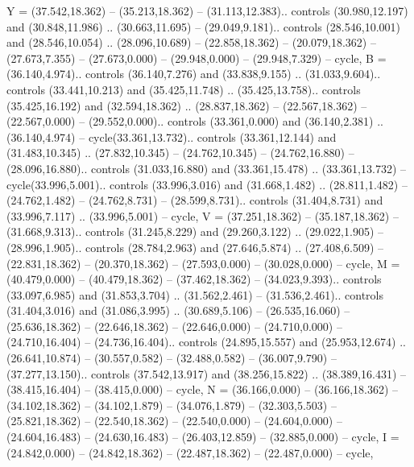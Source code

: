 {Y} = {(37.542,18.362) -- (35.213,18.362) -- (31.113,12.383).. controls (30.980,12.197) and (30.848,11.986) .. (30.663,11.695) -- (29.049,9.181).. controls (28.546,10.001) and (28.546,10.054) .. (28.096,10.689) -- (22.858,18.362) -- (20.079,18.362) -- (27.673,7.355) -- (27.673,0.000) -- (29.948,0.000) -- (29.948,7.329) -- cycle},
{B} = {(36.140,4.974).. controls (36.140,7.276) and (33.838,9.155) .. (31.033,9.604).. controls (33.441,10.213) and (35.425,11.748) .. (35.425,13.758).. controls (35.425,16.192) and (32.594,18.362) .. (28.837,18.362) -- (22.567,18.362) -- (22.567,0.000) -- (29.552,0.000).. controls (33.361,0.000) and (36.140,2.381) .. (36.140,4.974) -- cycle(33.361,13.732).. controls (33.361,12.144) and (31.483,10.345) .. (27.832,10.345) -- (24.762,10.345) -- (24.762,16.880) -- (28.096,16.880).. controls (31.033,16.880) and (33.361,15.478) .. (33.361,13.732) -- cycle(33.996,5.001).. controls (33.996,3.016) and (31.668,1.482) .. (28.811,1.482) -- (24.762,1.482) -- (24.762,8.731) -- (28.599,8.731).. controls (31.404,8.731) and (33.996,7.117) .. (33.996,5.001) -- cycle},
{V} = {(37.251,18.362) -- (35.187,18.362) -- (31.668,9.313).. controls (31.245,8.229) and (29.260,3.122) .. (29.022,1.905) -- (28.996,1.905).. controls (28.784,2.963) and (27.646,5.874) .. (27.408,6.509) -- (22.831,18.362) -- (20.370,18.362) -- (27.593,0.000) -- (30.028,0.000) -- cycle},
{M} = {(40.479,0.000) -- (40.479,18.362) -- (37.462,18.362) -- (34.023,9.393).. controls (33.097,6.985) and (31.853,3.704) .. (31.562,2.461) -- (31.536,2.461).. controls (31.404,3.016) and (31.086,3.995) .. (30.689,5.106) -- (26.535,16.060) -- (25.636,18.362) -- (22.646,18.362) -- (22.646,0.000) -- (24.710,0.000) -- (24.710,16.404) -- (24.736,16.404).. controls (24.895,15.557) and (25.953,12.674) .. (26.641,10.874) -- (30.557,0.582) -- (32.488,0.582) -- (36.007,9.790) -- (37.277,13.150).. controls (37.542,13.917) and (38.256,15.822) .. (38.389,16.431) -- (38.415,16.404) -- (38.415,0.000) -- cycle},
{N} = {(36.166,0.000) -- (36.166,18.362) -- (34.102,18.362) -- (34.102,1.879) -- (34.076,1.879) -- (32.303,5.503) -- (25.821,18.362) -- (22.540,18.362) -- (22.540,0.000) -- (24.604,0.000) -- (24.604,16.483) -- (24.630,16.483) -- (26.403,12.859) -- (32.885,0.000) -- cycle},
{I} = {(24.842,0.000) -- (24.842,18.362) -- (22.487,18.362) -- (22.487,0.000) -- cycle},
